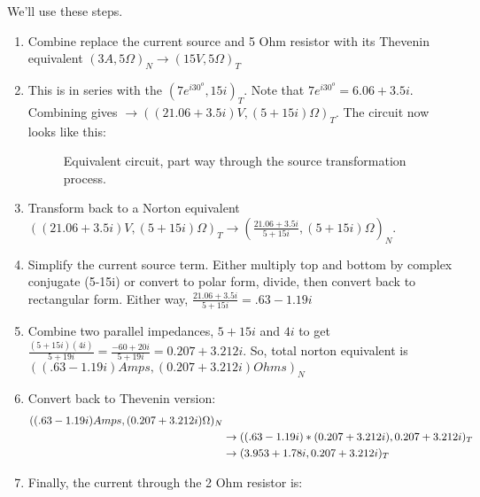 \documentclass{book}
\numberwithin{equation}{section}
\theoremstyle{definition}
\begin{document}
We'll use these steps.
\begin{enumerate}
\item Combine replace the current source and 5 Ohm resistor with its Thevenin equivalent $(3A,5\Omega)_N \rightarrow (15V,5\Omega)_T$
\item This is in series with the $(7e^{i30^o},15i)_T$. Note that $7e^{i30^o}=6.06+3.5i$. Combining gives $\rightarrow ( (21.06+3.5i) V,(5+15i)\Omega)_T$. The circuit now looks like this:

\par
\begin{figure}[H]
\begin{center}
\caption{Equivalent circuit, part way through the source transformation process.} 
\end{center}
\end{figure}

\item Transform back to a Norton equivalent $( (21.06+3.5i) V,(5+15i)\Omega)_T \rightarrow (\frac{21.06+3.5i}{5+15i},(5+15i)\Omega)_N$. 
\item Simplify the current source term. Either multiply top and bottom by complex conjugate (5-15i) or convert to polar form, divide, then convert back to rectangular form. Either way, $\frac{21.06+3.5i}{5+15i} = .63-1.19i$
\item Combine two parallel impedances, $5+15i$ and $4i$ to get $\frac{(5+15i)(4i)}{5+19i}=\frac{-60+20i}{5+19i}=0.207+3.212i$. So, total norton equivalent is $( (.63-1.19i) Amps,(0.207+3.212i) Ohms)_N$
\item Convert back to Thevenin version: 
\begin{align}
( (.63-1.19i) Amps,(0.207+3.212i)\Omega)_N& \notag \\
	&\rightarrow ( (.63-1.19i)*(0.207+3.212i),0.207+3.212i)_T \notag \\
	&\rightarrow (3.953+1.78i ,0.207+3.212i)_T
\end{align}
\item Finally, the current through the 2 Ohm resistor is:


\end{enumerate}
\end{document}
